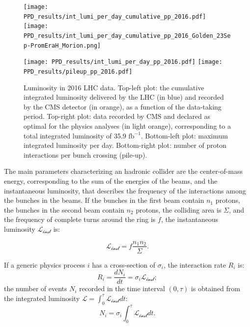\begin{figure}[!htb]
  \centering
    \texttt{[image: PPD\_results/int\_lumi\_per\_day\_cumulative\_pp\_2016.pdf]}%
    \texttt{[image: PPD\_results/int\_lumi\_per\_day\_cumulative\_pp\_2016\_Golden\_23Sep-PromEraH\_Morion.png]}

    \texttt{[image: PPD\_results/int\_lumi\_per\_day\_pp\_2016.pdf]}%
    \texttt{[image: PPD\_results/pileup\_pp\_2016.pdf]}

  \caption{Luminosity in 2016 LHC data. Top-left plot: the cumulative integrated luminosity delivered by the LHC (in blue) and recorded by the CMS detector (in orange), as a function of the data-taking period. Top-right plot: data recorded by CMS and declared as optimal for the physics analyses (in light orange), corresponding to a total integrated luminosity of 35.9 $\text{fb}^{-1}$. Bottom-left plot: maximum integrated luminosity per day. Bottom-right plot: number of proton interactions per bunch crossing (pile-up).~\cite{LumiPublicResults}}
  \label{fig:LHC_lumi}
\end{figure}

\noindent The main parameters characterizing an hadronic collider are the center-of-mass energy, corresponding to the sum of the energies of the beams, and the instantaneous luminosity, that describes the frequency of the interactions among the bunches in the beams. If the bunches in the first beam contain $n_1$ protons, the bunches in the second beam contain $n_2$ protons, the colliding area is $\Sigma$, and the frequency of complete turns
around the ring is $f$, the instantaneous luminosity $\mathcal{L_{\text{inst}}}$ is:

\begin{equation}
\mathcal{L_{\text{inst}}} = f \frac{n_1 n_2}{\Sigma}.
\label{eq:LHC_luminosity_def}
\end{equation}

\noindent If a generic physics process $i$ has a cross-section of $\sigma_i$, the interaction rate $R_i$ is:
\begin{equation}
R_i = \frac{dN_i}{dt}= \sigma_i \mathcal{L_{\text{inst}}};
\label{eq:LHC_interaction_rate}
\end{equation}
the number of events $N_i$ recorded in the time interval $(0,\tau)$ is obtained from the integrated luminosity $\mathcal{L} = \int_0^{\tau} \mathcal{L_{\text{inst}}} dt$:
\begin{equation}
N_i = \sigma_i \int_0^{\tau} \mathcal{L_{\text{inst}}} dt.
\end{equation}

